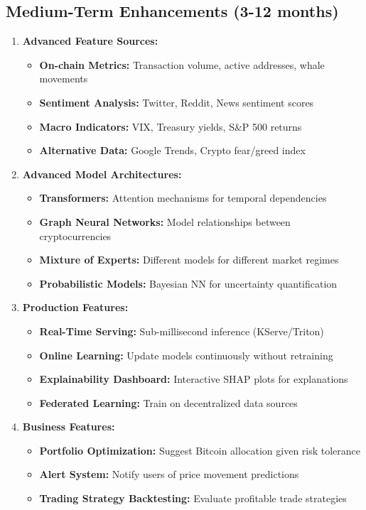 \subsection{Medium-Term Enhancements (3-12 months)}

\begin{enumerate}
    \item \textbf{Advanced Feature Sources:}
    \begin{itemize}
        \item \textbf{On-chain Metrics:} Transaction volume, active addresses, whale movements
        \item \textbf{Sentiment Analysis:} Twitter, Reddit, News sentiment scores
        \item \textbf{Macro Indicators:} VIX, Treasury yields, S\&P 500 returns
        \item \textbf{Alternative Data:} Google Trends, Crypto fear/greed index
    \end{itemize}
    
    \item \textbf{Advanced Model Architectures:}
    \begin{itemize}
        \item \textbf{Transformers:} Attention mechanisms for temporal dependencies
        \item \textbf{Graph Neural Networks:} Model relationships between cryptocurrencies
        \item \textbf{Mixture of Experts:} Different models for different market regimes
        \item \textbf{Probabilistic Models:} Bayesian NN for uncertainty quantification
    \end{itemize}
    
    \item \textbf{Production Features:}
    \begin{itemize}
        \item \textbf{Real-Time Serving:} Sub-millisecond inference (KServe/Triton)
        \item \textbf{Online Learning:} Update models continuously without retraining
        \item \textbf{Explainability Dashboard:} Interactive SHAP plots for explanations
        \item \textbf{Federated Learning:} Train on decentralized data sources
    \end{itemize}
    
    \item \textbf{Business Features:}
    \begin{itemize}
        \item \textbf{Portfolio Optimization:} Suggest Bitcoin allocation given risk tolerance
        \item \textbf{Alert System:} Notify users of price movement predictions
        \item \textbf{Trading Strategy Backtesting:} Evaluate profitable trade strategies
    \end{itemize}
\end{enumerate}

